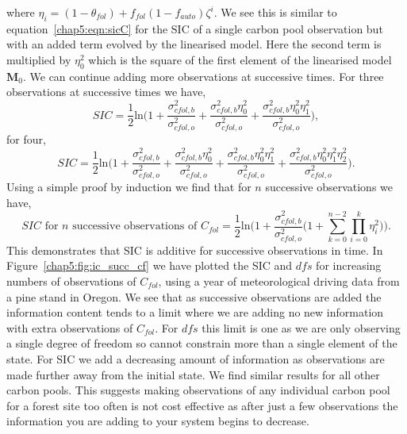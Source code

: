 where $\eta_i=(1-\theta_{fol})+f_{fol}(1-f_{auto})\zeta^{i}$. We see this is similar to equation~\eqref{chap5:eqn:sicC} for the SIC of a single carbon pool observation but with an added term evolved by the linearised model. Here the second term is multiplied by \(\eta_{0}^2\) which is the square of the first element of the linearised model \(\mathbf{M}_0\). We can continue adding more observations at successive times. For three observations at successive times we have,
\begin{equation}
SIC =\frac{1}{2}\text{ln} \bigg(1+\frac{\sigma_{cfol,b}^{2}}{\sigma_{cfol,o}^{2}}+\frac{\sigma_{cfol,b}^{2}\eta_0^{2}}{\sigma_{cfol,o}^{2}}+\frac{\sigma_{cfol,b}^{2}\eta_0^{2}\eta_1^{2}}{\sigma_{cfol,o}^{2}} \bigg),
\end{equation}
for four,
\begin{equation}
SIC =\frac{1}{2}\text{ln} \bigg(1+\frac{\sigma_{cfol,b}^{2}}{\sigma_{cfol,o}^{2}}+\frac{\sigma_{cfol,b}^{2}\eta_0^{2}}{\sigma_{cfol,o}^{2}}+\frac{\sigma_{cfol,b}^{2}\eta_0^{2}\eta_1^{2}}{\sigma_{cfol,o}^{2}}+\frac{\sigma_{cfol,b}^{2}\eta_0^{2}\eta_1^{2}\eta_2^{2}}{\sigma_{cfol,o}^{2}} \bigg).
\end{equation}
Using a simple proof by induction we find that for \(n\) successive observations we have,
\begin{equation}
SIC\text{ for }n\text{ successive observations of }C_{fol} = \frac{1}{2}\text{ln}\bigg(1+\frac{\sigma_{cfol,b}^{2}}{\sigma_{cfol,o}^{2}}\big(1+\sum_{k=0}^{n-2}\prod_{i=0}^{k}\eta_i^{2}\big)\bigg).
\end{equation}
This demonstrates that SIC is additive for successive observations in time. In Figure~\ref{chap5:fig:ic_succ_cf} we have plotted the SIC and \(dfs\) for increasing numbers of observations of \(C_{fol}\), using a year of meteorological driving data from a pine stand in Oregon. We see that as successive observations are added the information content tends to a limit where we are adding no new information with extra observations of \(C_{fol}\). For \(dfs\) this limit is one as we are only observing a single degree of freedom so cannot constrain more than a single element of the state. For SIC we add a decreasing amount of information as observations are made further away from the initial state. We find similar results for all other carbon pools. This suggests making observations of any individual carbon pool for a forest site too often is not cost effective as after just a few observations the information you are adding to your system begins to decrease. 

